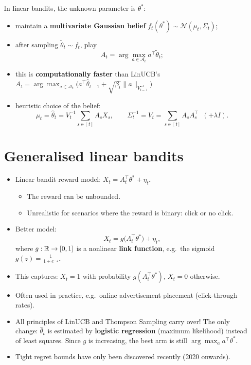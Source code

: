 In linear bandits, the unknown parameter is $\theta^*$:
\begin{itemize}
    \item maintain a \textbf{multivariate Gaussian belief} $f_t(\theta^*) \sim \mathcal{N}(\mu_t, \Sigma_t)$;
    \item after sampling $\tilde{\theta}_t \sim f_t$, play
    \[
    A_t = \arg\max_{a\in\mathcal{A}_t} a^\top\tilde{\theta}_t;
    \]
    \item this is \textbf{computationally faster} than LinUCB's $A_t = \arg\max_{a\in\mathcal{A}_t}\big(a^\top\hat{\theta}_{t-1} + \sqrt{\beta_t}\|a\|_{V_{t-1}^{-1}}\big)$
    \item heuristic choice of the belief:
    \[
    \mu_t = \hat{\theta}_t = V_t^{-1}\sum_{s\in[t]} A_sX_s, \qquad \Sigma_t^{-1} = V_t = \sum_{s\in[t]} A_sA_s^\top \;\;(+\lambda I).
    \]
\end{itemize}

\section{Generalised linear bandits}

\begin{itemize}
    \item Linear bandit reward model: $X_t = A_t^\top\theta^* + \eta_t$.
    \begin{itemize}
        \item The reward can be unbounded.
        \item Unrealistic for scenarios where the reward is binary: click or no click.
    \end{itemize}
    \item Better model:
    \[
    X_t = g\big(A_t^\top\theta^*\big) + \eta_t,
    \]
    where $g : \mathbb{R} \to [0,1]$ is a nonlinear \textbf{link function}, e.g.\ the sigmoid $g(z) = \frac{1}{1 + e^{-z}}$.
    \item This captures: $X_t = 1$ with probability $g(A_t^\top\theta^*)$, $X_t = 0$ otherwise.
    \item Often used in practice, e.g.\ online advertisement placement (click-through rates).
    \item All principles of LinUCB and Thompson Sampling carry over! The only change: $\hat{\theta}_t$ is estimated by \textbf{logistic regression} (maximum likelihood) instead of least squares. Since $g$ is increasing, the best arm is still $\arg\max_a a^\top\theta^*$.
    \item Tight regret bounds have only been discovered recently (2020 onwards).
\end{itemize}
